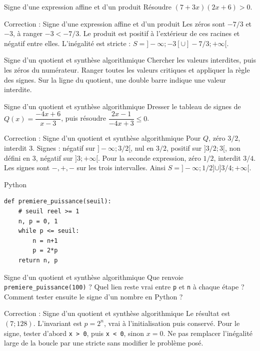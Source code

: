 \documentclass[aspectratio=169,10pt]{beamer}
\begin{document}
\begin{frame}{Signe d'une expression affine et d'un produit}
Résoudre \((7+3x)(2x+6)>0\).
\end{frame}
\begin{frame}{Correction : Signe d'une expression affine et d'un produit}
Les zéros sont \(-7/3\) et \(-3\), à ranger \(-3<-7/3\). Le produit est positif à l'extérieur de ces racines et négatif entre elles. L'inégalité est stricte : \(S=]-\infty;-3[\cup]-7/3;+\infty[\).
\end{frame}
\begin{frame}{Signe d'un quotient et synthèse algorithmique}
Chercher les valeurs interdites, puis les zéros du numérateur. Ranger toutes les valeurs critiques et appliquer la règle des signes. Sur la ligne du quotient, une double barre indique une valeur interdite.
\end{frame}
\begin{frame}{Signe d'un quotient et synthèse algorithmique}
Dresser le tableau de signes de \(Q(x)=\dfrac{-4x+6}{x-3}\), puis résoudre \(\dfrac{2x-1}{-4x+3}\leq0\).
\end{frame}
\begin{frame}{Correction : Signe d'un quotient et synthèse algorithmique}
Pour \(Q\), zéro \(3/2\), interdit \(3\). Signes : négatif sur \(]-\infty;3/2[\), nul en \(3/2\), positif sur \(]3/2;3[\), non défini en \(3\), négatif sur \(]3;+\infty[\).
Pour la seconde expression, zéro \(1/2\), interdit \(3/4\). Les signes sont \(-,+,-\) sur les trois intervalles. Ainsi \(S=]-\infty;1/2]\cup]3/4;+\infty[\).
\end{frame}
\begin{frame}[fragile]{Python}
\small
\begin{verbatim}
def premiere_puissance(seuil):
    # seuil reel >= 1
    n, p = 0, 1
    while p <= seuil:
        n = n+1
        p = 2*p
    return n, p
\end{verbatim}
\end{frame}
\begin{frame}{Signe d'un quotient et synthèse algorithmique}
Que renvoie \texttt{premiere\_puissance(100)} ? Quel lien reste vrai entre \texttt{p} et \texttt{n} à chaque étape ? Comment tester ensuite le signe d'un nombre en Python ?
\end{frame}
\begin{frame}{Correction : Signe d'un quotient et synthèse algorithmique}
Le résultat est \((7;128)\). L'invariant est \(p=2^n\), vrai à l'initialisation puis conservé. Pour le signe, tester d'abord \texttt{x > 0}, puis \texttt{x < 0}, sinon \(x=0\). Ne pas remplacer l'inégalité large de la boucle par une stricte sans modifier le problème posé.
\end{frame}
\end{document}
